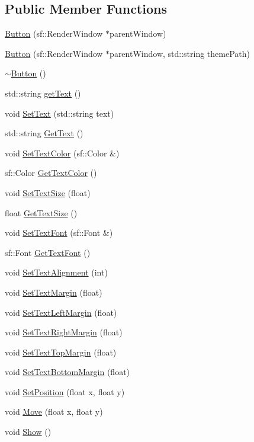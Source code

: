 \subsection*{Public Member Functions}
\begin{CompactItemize}
\item 
\hyperlink{classsfgui_1_1Button_05c78461b775a073bed1e218586defd7}{Button} (sf::RenderWindow $\ast$parentWindow)
\item 
\hyperlink{classsfgui_1_1Button_5189b70c8f868718f79c7e119e0b9b32}{Button} (sf::RenderWindow $\ast$parentWindow, std::string themePath)
\item 
\hyperlink{classsfgui_1_1Button_835b0cbc92ef98e4c884398e036d26ca}{$\sim$Button} ()
\item 
std::string \hyperlink{classsfgui_1_1Button_015166159ef486c5001c5b58e79abc2d}{getText} ()
\item 
void \hyperlink{classsfgui_1_1Button_48ddf97b9a9f77517f5bf70e93df2b80}{SetText} (std::string text)
\item 
std::string \hyperlink{classsfgui_1_1Button_f731f8fe61ce30a7e405d8d3a56c5f22}{GetText} ()
\item 
void \hyperlink{classsfgui_1_1Button_af73ff1983944ea0969bf5c7421725c5}{SetTextColor} (sf::Color \&)
\item 
sf::Color \hyperlink{classsfgui_1_1Button_7eca4b2322ce0785e64bd2932912b974}{GetTextColor} ()
\item 
void \hyperlink{classsfgui_1_1Button_eed26d1a50f825f24ef1f2a16ef0b425}{SetTextSize} (float)
\item 
float \hyperlink{classsfgui_1_1Button_ed3a5fc8690d92ee59483b5dd7de6dbf}{GetTextSize} ()
\item 
void \hyperlink{classsfgui_1_1Button_f1a92c908326f7bd9973da154854a8bd}{SetTextFont} (sf::Font \&)
\item 
sf::Font \hyperlink{classsfgui_1_1Button_8b3a0a7ac0482c039e11bb615a55e86b}{GetTextFont} ()
\item 
void \hyperlink{classsfgui_1_1Button_c1c0fe577ad7bfa1367ad406ae087bd1}{SetTextAlignment} (int)
\item 
void \hyperlink{classsfgui_1_1Button_af84ec76e02e12c55667b960d80cc90b}{SetTextMargin} (float)
\item 
void \hyperlink{classsfgui_1_1Button_94b8976462b04b1a0e63542dd49aa7c8}{SetTextLeftMargin} (float)
\item 
void \hyperlink{classsfgui_1_1Button_4a4b4c339d001a0578c5e70b01ef164b}{SetTextRightMargin} (float)
\item 
void \hyperlink{classsfgui_1_1Button_cd571ac750ad4f9f957da40fb1ae23d7}{SetTextTopMargin} (float)
\item 
void \hyperlink{classsfgui_1_1Button_18a553fdcfbcf42d7764d3e039a72708}{SetTextBottomMargin} (float)
\item 
void \hyperlink{classsfgui_1_1Button_4160a1abdec76e06db9b34b80f5fa12c}{SetPosition} (float x, float y)
\item 
void \hyperlink{classsfgui_1_1Button_be36461c2e85c67b6cc42f3a6cba0468}{Move} (float x, float y)
\item 
void \hyperlink{classsfgui_1_1Button_94dc6919349ff5ca9f334cce78afbe39}{Show} ()
\end{CompactItemize}
